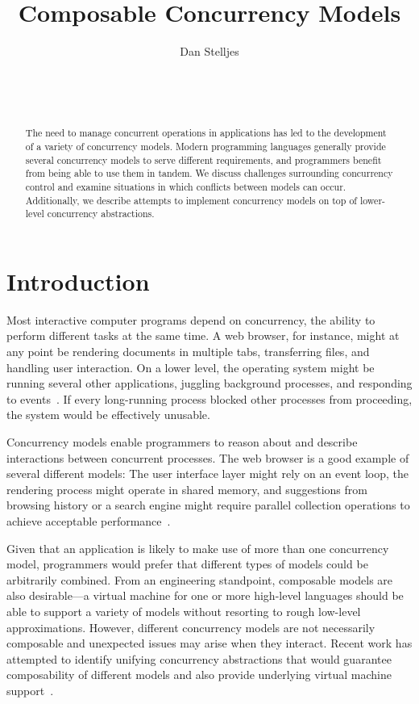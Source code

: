 \documentclass{sig-alternate}
\author{
\alignauthor{}
Dan Stelljes\\
  \affaddr{Division of Science and Mathematics}\\
  \affaddr{University of Minnesota, Morris}\\
  \affaddr{Morris, Minnesota, USA 56267}\\
  \email{stell124@morris.umn.edu}
}
\title{Composable Concurrency Models}
\begin{document}
\maketitle

\begin{abstract}

The need to manage concurrent operations in applications has led to the development of a variety of concurrency models. Modern programming languages generally provide several concurrency models to serve different requirements, and programmers benefit from being able to use them in tandem. We discuss challenges surrounding concurrency control and examine situations in which conflicts between models can occur. Additionally, we describe attempts to implement concurrency models on top of lower-level concurrency abstractions.

\end{abstract}


\section{Introduction}

Most interactive computer programs depend on concurrency, the ability to perform different tasks at the same time. A web browser, for instance, might at any point be rendering documents in multiple tabs, transferring files, and handling user interaction. On a lower level, the operating system might be running several other applications, juggling background processes, and responding to events~\cite{Swalens2014}. If every long-running process blocked other processes from proceeding, the system would be effectively unusable.

Concurrency models enable programmers to reason about and describe interactions between concurrent processes. The web browser is a good example of several different models: The user interface layer might rely on an event loop, the rendering process might operate in shared memory, and suggestions from browsing history or a search engine might require parallel collection operations to achieve acceptable performance~\cite{Marr2012}.

Given that an application is likely to make use of more than one concurrency model, programmers would prefer that different types of models could be arbitrarily combined. From an engineering standpoint, composable models are also desirable---a virtual machine for one or more high-level languages should be able to support a variety of models without resorting to rough low-level approximations. However, different concurrency models are not necessarily composable and unexpected issues may arise when they interact. Recent work has attempted to identify unifying concurrency abstractions that would guarantee composability of different models and also provide underlying virtual machine support~\cite{Marr2009, Marr2012, Swalens2014, Ziv2015}.
\end{document}

